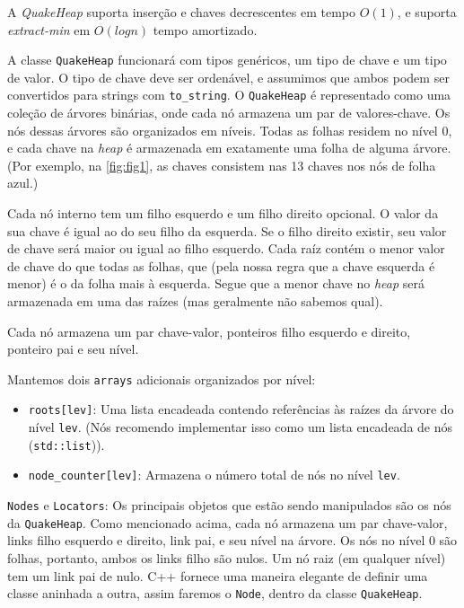 \documentclass{article}
\begin{document}
A \textit{QuakeHeap} suporta inserção e chaves decrescentes em tempo $O(1)$, e suporta \textit{extract-min} em $O(log n)$ tempo amortizado. 

A classe \texttt{QuakeHeap} funcionará com tipos genéricos, um tipo de chave
e um tipo de valor. O tipo de chave deve ser ordenável, e assumimos que ambos podem ser convertidos para strings com \texttt{to\_string}. 
O \texttt{QuakeHeap}  é representado como uma coleção de árvores binárias, onde cada nó armazena um par de valores-chave. Os nós dessas árvores são organizados em níveis. Todas as folhas residem no nível 0, e cada chave na \textit{heap} é armazenada em exatamente uma folha de alguma árvore. (Por exemplo, na \autoref{fig:fig1},
as chaves consistem nas 13 chaves nos nós de folha azul.)

Cada nó interno tem um filho esquerdo e um filho direito opcional. O valor da sua chave é igual ao do seu filho da esquerda. Se o filho direito existir, seu valor de chave será maior ou igual ao filho esquerdo. Cada raíz contém o menor valor de chave do que todas as folhas, que (pela nossa regra que a chave esquerda é menor) é o da folha mais à esquerda. Segue que a menor chave no \textit{heap} será armazenada em uma das raízes (mas geralmente não sabemos qual).

Cada nó armazena um par chave-valor, ponteiros filho esquerdo e direito, ponteiro pai e seu nível. 

Mantemos dois \texttt{arrays} adicionais organizados por nível:
\begin{itemize}
    \item \texttt{roots[lev]}: Uma lista encadeada contendo referências às raízes da árvore do nível \texttt{lev}. (Nós recomendo implementar isso como um lista encadeada de nós (\texttt{std::list})).
    \item \texttt{node\_counter[lev]}: Armazena o número total de nós no nível \texttt{lev}.
\end{itemize}

\texttt{Nodes} e \texttt{Locators}: Os principais objetos que estão sendo manipulados são os nós da \texttt{QuakeHeap}. Como mencionado acima, cada nó armazena um par chave-valor, links filho esquerdo e direito, link pai,
e seu nível na árvore. Os nós no nível 0 são folhas, portanto, ambos os links filho são nulos. Um nó raiz (em qualquer nível) tem um link pai de nulo. C++ fornece uma maneira elegante de definir uma classe aninhada a outra, assim faremos o \texttt{Node}, dentro da classe \texttt{QuakeHeap}.
\end{document}
